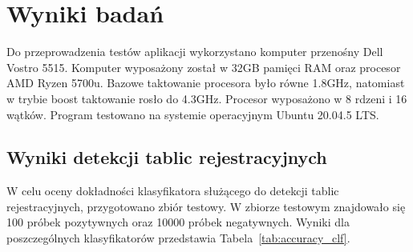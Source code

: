 
\chapter{Wyniki badań}
Do przeprowadzenia testów aplikacji wykorzystano komputer przenośny Dell Vostro 5515.
Komputer wyposażony został w 32GB pamięci RAM oraz procesor AMD Ryzen 5700u.
Bazowe taktowanie procesora było równe 1.8GHz, natomiast w trybie boost taktowanie rosło do 4.3GHz.
Procesor wyposażono w 8 rdzeni i 16 wątków.
Program testowano na systemie operacyjnym Ubuntu 20.04.5 LTS\@.


\section{Wyniki detekcji tablic rejestracyjnych}
W celu oceny dokładności klasyfikatora służącego do detekcji tablic rejestracyjnych, przygotowano zbiór testowy.
W zbiorze testowym znajdowało się 100 próbek pozytywnych oraz 10000 próbek negatywnych.
Wyniki dla poszczególnych klasyfikatorów przedstawia Tabela~\ref{tab:accuracy_clf}.

